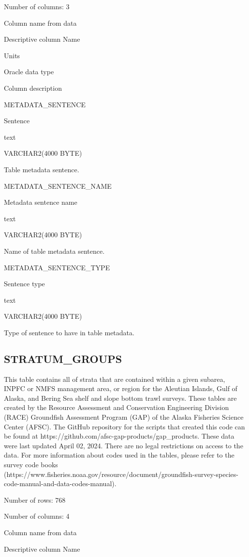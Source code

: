 \documentclass[
  letterpaper,
  oneside,
  open=any]{scrbook}
\begin{document}
Number of columns: 3

Column name from data

Descriptive column Name

Units

Oracle data type

Column description

METADATA\_SENTENCE

Sentence

text

VARCHAR2(4000 BYTE)

Table metadata sentence.

METADATA\_SENTENCE\_NAME

Metadata sentence name

text

VARCHAR2(4000 BYTE)

Name of table metadata sentence.

METADATA\_SENTENCE\_TYPE

Sentence type

text

VARCHAR2(4000 BYTE)

Type of sentence to have in table metadata.

\hypertarget{stratum_groups}{%
\subsection{STRATUM\_GROUPS}\label{stratum_groups}}

This table contains all of strata that are contained within a given
subarea, INPFC or NMFS management area, or region for the Aleutian
Islands, Gulf of Alaska, and Bering Sea shelf and slope bottom trawl
surveys. These tables are created by the Resource Assessment and
Conservation Engineering Division (RACE) Groundfish Assessment Program
(GAP) of the Alaska Fisheries Science Center (AFSC). The GitHub
repository for the scripts that created this code can be found at
https://github.com/afsc-gap-products/gap\_products. These data were last
updated April 02, 2024. There are no legal restrictions on access to the
data. For more information about codes used in the tables, please refer
to the survey code books
(https://www.fisheries.noaa.gov/resource/document/groundfish-survey-species-code-manual-and-data-codes-manual).

Number of rows: 768

Number of columns: 4

Column name from data

Descriptive column Name
\end{document}
